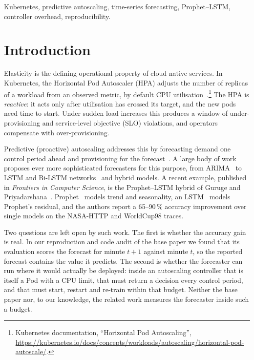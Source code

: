 \documentclass[conference,a4paper]{IEEEtran}
\begin{document}
\begin{IEEEkeywords}
Kubernetes, predictive autoscaling, time-series forecasting, Prophet--LSTM, controller overhead, reproducibility.
\end{IEEEkeywords}

\section{Introduction}
Elasticity is the defining operational property of cloud-native services. In Kubernetes, the Horizontal Pod
Autoscaler (HPA) adjusts the number of replicas of a workload from an observed metric, by default CPU
utilisation~\cite{burns2016,nguyen2020}.\footnote{Kubernetes documentation, ``Horizontal Pod Autoscaling'', \url{https://kubernetes.io/docs/concepts/workloads/autoscaling/horizontal-pod-autoscale/}.} The HPA is \emph{reactive}: it acts only after utilisation has crossed its
target, and the new pods need time to start. Under sudden load increases this produces a window of
under-provisioning and service-level objective (SLO) violations, and operators compensate with over-provisioning.

Predictive (proactive) autoscaling addresses this by forecasting demand one control period ahead and provisioning
for the forecast~\cite{lorido2014,qu2018,aldhuraibi2018,dogani2023}. A large body of work proposes ever more sophisticated forecasters for
this purpose, from ARIMA~\cite{calheiros2015} to LSTM and Bi-LSTM networks~\cite{imdoukh2020,dangquang2021} and
hybrid models. A recent example, published in \emph{Frontiers in Computer Science}, is the Prophet--LSTM hybrid of
Guruge and Priyadarshana~\cite{guruge2025}. Prophet~\cite{taylor2018} models trend and seasonality, an
LSTM~\cite{hochreiter1997} models Prophet's residual, and the authors report a 65--90\,\% accuracy improvement
over single models on the NASA-HTTP and WorldCup98 traces.

Two questions are left open by such work. The first is whether the accuracy gain is real. In our reproduction and
code audit of the base paper we found that its evaluation scores the forecast for minute $t{+}1$ against minute $t$,
so the reported forecast contains the value it predicts. The second is whether the forecaster can run where it
would actually be deployed: inside an autoscaling controller that is itself a Pod with a CPU limit, that must
return a decision every control period, and that must start, restart and re-train within that budget. Neither
the base paper nor, to our knowledge, the related work measures the forecaster inside such a budget.
\end{document}
